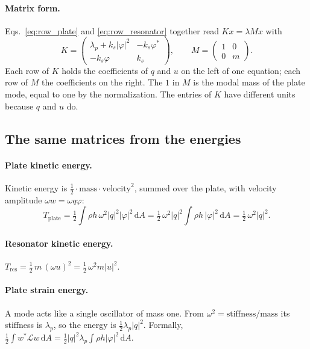 \paragraph{Matrix form.}
Eqs.~\eqref{eq:row_plate} and \eqref{eq:row_resonator} together read
$K x = \lambda M x$ with
\begin{equation}
  K = \begin{pmatrix} \lambda_p + k_s|\varphi|^2 & -k_s\varphi^* \\ -k_s\varphi & k_s \end{pmatrix},
  \qquad
  M = \begin{pmatrix} 1 & 0 \\ 0 & m \end{pmatrix} .
  \label{eq:KM_resonator}
\end{equation}
Each row of $K$ holds the coefficients of $q$ and $u$ on the left of one
equation; each row of $M$ the coefficients on the right. The $1$ in $M$ is the
modal mass of the plate mode, equal to one by the normalization. The entries of
$K$ have different units because $q$ and $u$ do.

\subsection{The same matrices from the energies}

\paragraph{Plate kinetic energy.} Kinetic energy is
$\tfrac12\cdot\text{mass}\cdot\text{velocity}^2$, summed over the plate, with
velocity amplitude $\omega w = \omega q\varphi$:
\begin{equation}
  T_\mathrm{plate} = \tfrac12 \int \rho h\, \omega^2 |q|^2 |\varphi|^2 \,\mathrm{d}A
  = \tfrac12\,\omega^2 |q|^2 \int \rho h\, |\varphi|^2\,\mathrm{d}A
  = \tfrac12\,\omega^2 |q|^2 .
\end{equation}

\paragraph{Resonator kinetic energy.} $T_\mathrm{res} = \tfrac12\, m\, (\omega u)^2 = \tfrac12\,\omega^2 m |u|^2$.

\paragraph{Plate strain energy.} A mode acts like a single oscillator of mass
one. From $\omega^2 = \text{stiffness}/\text{mass}$ its stiffness is
$\lambda_p$, so the energy is $\tfrac12\lambda_p|q|^2$. Formally,
$\tfrac12\int w^*\mathcal{L}w\,\mathrm{d}A = \tfrac12|q|^2\lambda_p\int\rho h|\varphi|^2\,\mathrm{d}A$.

